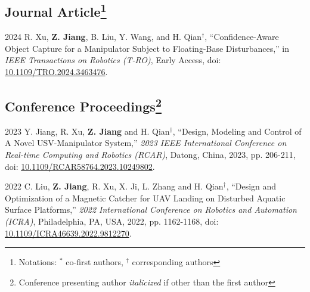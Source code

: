 \documentclass[11pt,letterpaper]{report}
\begin{document}
\subsection*{Journal Article\footnote{\label{authorship}Notations: $^*$ co-first authors, $^\dagger$ corresponding authors}}
\begin{tablist}
	\item[2024]  \tab{}R. Xu, \textbf{Z. Jiang}, B. Liu, Y. Wang, and H. Qian$^\dagger$, ``Confidence-Aware Object Capture for a Manipulator Subject to Floating-Base Disturbances,'' in \textit{IEEE Transactions on Robotics (T-RO)}, Early Access,  doi: \href{https://doi.org/10.1109/TRO.2024.3463476}{10.1109/TRO.2024.3463476}.
\end{tablist}
	
\subsection*{Conference Proceedings\footnote{\label{pre-author}Conference presenting author \textit{italicized} if other than the first author}}
\begin{tablist}
	\item[2023]   \tab{}Y. Jiang, R. Xu, \textbf{Z. Jiang} and H. Qian$^\dagger$, ``Design, Modeling and Control of A Novel USV-Manipulator System,'' \textit{2023 IEEE International Conference on Real-time Computing and Robotics (RCAR)}, Datong, China, 2023, pp. 206-211, doi: \href{https://doi.org/10.1109/RCAR58764.2023.10249802}{ 10.1109/RCAR58764.2023.10249802}.
		
	\item[2022]   \tab{}C. Liu, \textbf{Z. Jiang}, R. Xu, X. Ji, L. Zhang and H. Qian$^\dagger$, ``Design and Optimization of a Magnetic Catcher for UAV Landing on Disturbed Aquatic Surface Platforms,'' \textit{2022 International Conference on Robotics and Automation (ICRA)}, Philadelphia, PA, USA, 2022, pp. 1162-1168, doi: \href{https://doi.org/10.1109/ICRA46639.2022.9812270}{ 10.1109/ICRA46639.2022.9812270}.
\end{tablist}
	
\end{document}
